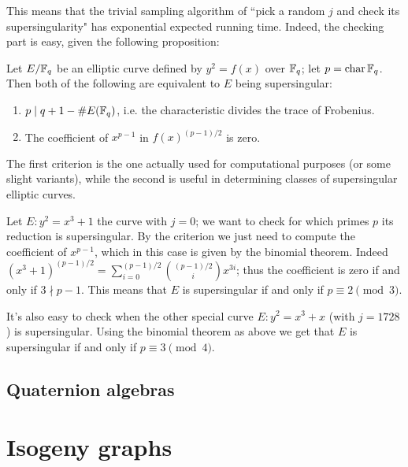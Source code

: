 This means that the trivial sampling algorithm of ``pick a random $j$ and check its supersingularity" has exponential expected running time. Indeed, the checking part is easy, given the following proposition:
\begin{proposition}
    Let $E/\mathbb{F}_q$ be an elliptic curve defined by $y^2=f(x)$ over $\mathbb{F}_q$; let $p=\operatorname{char}\mathbb{F}_q$. Then both of the following are equivalent to $E$ being supersingular:
    \begin{enumerate}
        \item $p\mid q+1-\# E(\mathbb{F}_q)$, i.e. the characteristic divides the trace of Frobenius.
        \item The coefficient of $x^{p-1}$ in $f(x)^{(p-1)/2}$ is zero.
    \end{enumerate}
\end{proposition}

The first criterion is the one actually used for computational purposes (or some slight variants), while the second is useful in determining classes of supersingular elliptic curves.

\begin{example}
    Let $E:y^2=x^3+1$ the curve with $j=0$; we want to check for which primes $p$ its reduction is supersingular. By the criterion we just need to compute the coefficient of $x^{p-1}$, which in this case is given by the binomial theorem. Indeed $(x^3+1)^{(p-1)/2}=\sum_{i=0}^{(p-1)/2}\binom{(p-1)/2}{i}x^{3i}$; thus the coefficient is zero if and only if $3\nmid p-1$. This means that $E$ is supersingular if and only if $p\equiv2\pmod 3$.
\end{example}

\begin{example}
    It's also easy to check when the other special curve $E: y^2=x^3+x$ (with $j=1728$) is supersingular. Using the binomial theorem as above we get that $E$ is supersingular if and only if $p\equiv3\pmod4$.
\end{example}

\subsection{Quaternion algebras}

\section{Isogeny graphs}

